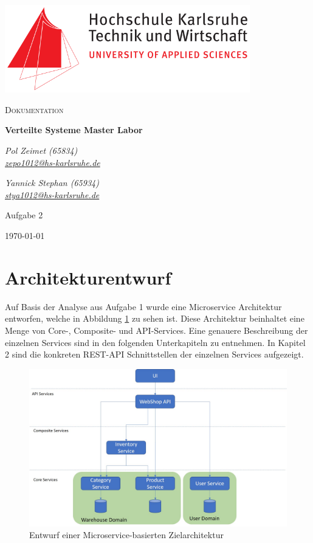 \documentclass[12pt,a4paper]{article}
\begin{document}
	\begin{titlepage}
		\centering
		\includegraphics[width=0.8\textwidth]{img/Hska_logo.png}\par\vspace{1cm}
		{\scshape\LARGE Dokumentation\par}
		\vspace{1.5cm}
		{\huge\bfseries Verteilte Systeme Master Labor\par}
		\vspace{2cm}
		{\Large\itshape Pol Zeimet (65834) \\\href{mailto:zepo1012@hs-karlsruhe.de}{zepo1012@hs-karlsruhe.de}\par}
		\vfill
		{\Large\itshape Yannick Stephan (65934) \\\href{mailto:stya1012@hs-karlsruhe.de}{stya1012@hs-karlsruhe.de}\par}
		\vfill
		\large Aufgabe 2
		
		\vfill
		
		{\large \today\par}
	\end{titlepage}
	\section{Architekturentwurf}
	\label{sec:Architekturentwurf}
		Auf Basis der Analyse aus Aufgabe 1 wurde eine Microservice Architektur entworfen, welche in Abbildung \ref{fig:microservices-architecture} zu sehen ist. Diese Architektur beinhaltet eine Menge von Core-, Composite- und API-Services. Eine genauere Beschreibung der einzelnen Services sind in den folgenden Unterkapiteln zu entnehmen. In Kapitel 2 sind die konkreten REST-API Schnittstellen der einzelnen Services aufgezeigt.
		
		\begin{figure}[H]
			\centering
			\includegraphics[scale=0.45]{diagrams/microservices-architecture.jpg}
			\caption{Entwurf einer Microservice-basierten Zielarchitektur}
			\label{fig:microservices-architecture}
		\end{figure}
	
\end{document}
